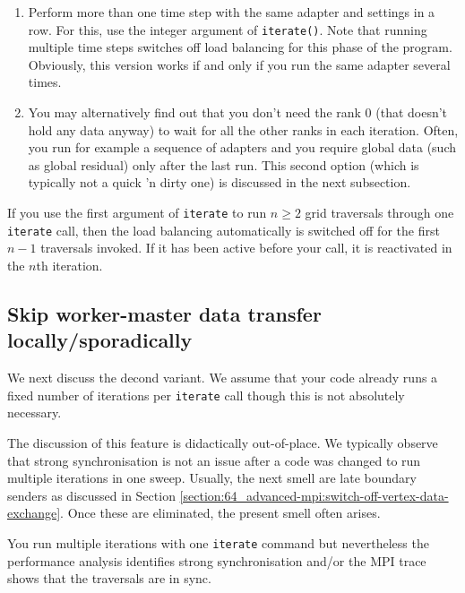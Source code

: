 \begin{enumerate}
  \item Perform more than one time step with the same adapter and settings in a
  row. For this, use the integer argument of \texttt{iterate()}. Note that
  running multiple time steps switches off load balancing for this phase of the program.
  Obviously, this version works if and only if you run the same adapter several 
  times.
  \item You may alternatively find out that you don't need the rank 0 (that
  doesn't hold any data anyway) to wait for all the other ranks in each
  iteration. Often, you run for example a sequence of adapters and you require
  global data (such as global residual) only after the last run. 
  This second option (which is typically not a quick 'n dirty one) is discussed
  in the next subsection. 
\end{enumerate}

\begin{remark}
 If you use the first argument of \texttt{iterate} to run $n\geq 2$ grid
 traversals through one  \texttt{iterate} call, then the load balancing
 automatically is switched off for the first $n-1$ traversals invoked. If
 it has been active before your call, it is reactivated in the $n$th iteration.
\end{remark}


\subsection{Skip worker-master data transfer locally/sporadically}

We next discuss the decond variant.
We assume that your code already runs a fixed number of iterations per
\texttt{iterate} call though this is not absolutely necessary.

\begin{remark}
The discussion of this feature is didactically out-of-place. We typically
observe that strong synchronisation is not an issue after a code was changed to
run multiple iterations in one sweep. Usually, the next smell are late boundary
senders as discussed in Section
\ref{section:64_advanced-mpi:switch-off-vertex-data-exchange}. Once these are
eliminated, the present smell often arises.
\end{remark}


\begin{smell}
You run multiple iterations with one \texttt{iterate} command but nevertheless
the performance analysis identifies strong synchronisation and/or
the MPI trace shows that the traversals are in sync.
\end{smell}

